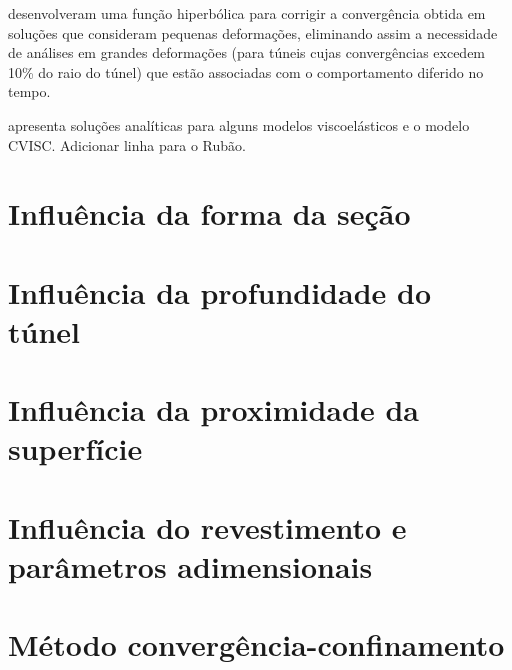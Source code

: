 \textbf{} desenvolveram uma função hiperbólica para corrigir a convergência obtida em soluções que consideram pequenas deformações, eliminando assim a necessidade de análises em grandes deformações (para túneis cujas convergências excedem 10\% do raio do túnel) que estão associadas com o comportamento diferido no tempo.

\textbf{} apresenta soluções analíticas para alguns modelos viscoelásticos e o modelo CVISC. Adicionar linha para o Rubão.

\section{Influência da forma da seção}

\section{Influência da profundidade do túnel}

\section{Influência da proximidade da superfície}

\section{Influência do revestimento e parâmetros adimensionais}

\section{Método convergência-confinamento}




